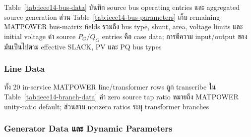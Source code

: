 \documentclass[12pt,a4paper]{article}
\begin{document}
Table~\ref{tab:ieee14-bus-data} บันทึก source bus operating entries และ aggregated source generation ส่วน Table~\ref{tab:ieee14-bus-parameters} เก็บ remaining MATPOWER bus-matrix fields รวมถึง bus type, shunt, area, voltage limits และ initial voltage ค่า source $P_G/Q_G$ entries คือ case data; การตีความ input/output ของมันเป็นไปตาม effective SLACK, PV และ PQ bus types

\begin{table}[H]\centering\small
\caption{IEEE14 bus-type assignment รวมถึง MATPOWER type codes และ buses ในแต่ละ SLACK, PV และ PQ group}
\label{tab:ieee14-bus-types}
\resizebox{.78\textwidth}{!}{}
\end{table}

\begin{table}[H]\centering\small
\caption{IEEE 14-bus data และ bus types ที่ share กันโดย in-house และ PSAT runs}
\label{tab:ieee14-bus-data}
\resizebox{\textwidth}{!}{}
\end{table}

\begin{table}[H]\centering\scriptsize
\caption{MATPOWER IEEE14 bus data: complete bus-matrix parameters ที่จ่ายให้ case converter}
\label{tab:ieee14-bus-parameters}
\resizebox{\textwidth}{!}{}
\end{table}

\subsubsection{Line Data}

ทั้ง 20 in-service MATPOWER line/transformer rows ถูก transcribe ใน Table~\ref{tab:ieee14-branch-data} ค่า zero source tap ratio หมายถึง MATPOWER unity-ratio default; ส่วนสาม nonzero ratios ระบุ transformer branches

\begin{table}[H]\centering\scriptsize
\caption{MATPOWER IEEE14 line และ transformer data (branch matrix); ทั้ง 20 rows อยู่ใน service}
\label{tab:ieee14-branch-data}
\resizebox{\textwidth}{!}{}
\end{table}

\subsubsection{Generator Data และ Dynamic Parameters}
\end{document}
